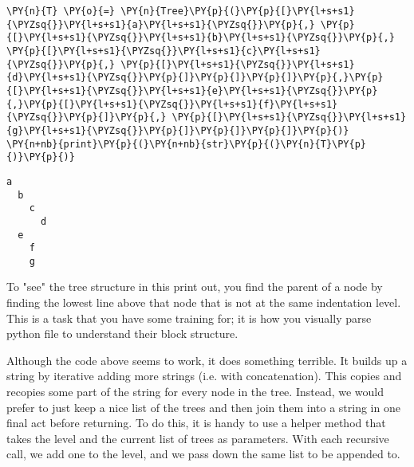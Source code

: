 \begin{Verbatim}[commandchars=\\\{\}]
\PY{n}{T} \PY{o}{=} \PY{n}{Tree}\PY{p}{(}\PY{p}{[}\PY{l+s+s1}{\PYZsq{}}\PY{l+s+s1}{a}\PY{l+s+s1}{\PYZsq{}}\PY{p}{,} \PY{p}{[}\PY{l+s+s1}{\PYZsq{}}\PY{l+s+s1}{b}\PY{l+s+s1}{\PYZsq{}}\PY{p}{,} \PY{p}{[}\PY{l+s+s1}{\PYZsq{}}\PY{l+s+s1}{c}\PY{l+s+s1}{\PYZsq{}}\PY{p}{,} \PY{p}{[}\PY{l+s+s1}{\PYZsq{}}\PY{l+s+s1}{d}\PY{l+s+s1}{\PYZsq{}}\PY{p}{]}\PY{p}{]}\PY{p}{]}\PY{p}{,}\PY{p}{[}\PY{l+s+s1}{\PYZsq{}}\PY{l+s+s1}{e}\PY{l+s+s1}{\PYZsq{}}\PY{p}{,}\PY{p}{[}\PY{l+s+s1}{\PYZsq{}}\PY{l+s+s1}{f}\PY{l+s+s1}{\PYZsq{}}\PY{p}{]}\PY{p}{,} \PY{p}{[}\PY{l+s+s1}{\PYZsq{}}\PY{l+s+s1}{g}\PY{l+s+s1}{\PYZsq{}}\PY{p}{]}\PY{p}{]}\PY{p}{]}\PY{p}{)}
\PY{n+nb}{print}\PY{p}{(}\PY{n+nb}{str}\PY{p}{(}\PY{n}{T}\PY{p}{)}\PY{p}{)}
\end{Verbatim}

\begin{Verbatim}
a
  b
    c
      d
  e
    f
    g

\end{Verbatim}


To "see" the tree structure in this print out, you find the parent of a node by finding the lowest line above that node that is not at the same indentation level.
This is a task that you have some training for; it is how you visually parse python file to understand their block structure.


Although the code above seems to work, it does something terrible.
It builds up a string by iterative adding more strings (i.e. with concatenation).
This copies and recopies some part of the string for every node in the tree.
Instead, we would prefer to just keep a nice list of the trees and then join them into a string in one final act before returning.
To do this, it is handy to use a helper method that takes the level and the current list of trees as parameters.
With each recursive call, we add one to the level, and we pass down the same list to be appended to.

